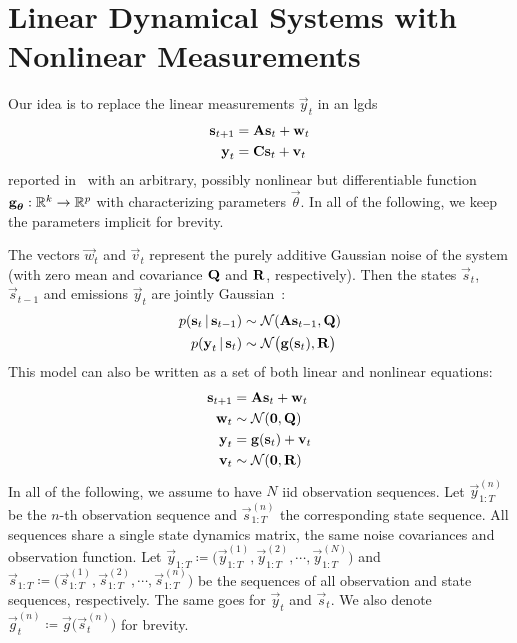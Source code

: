 \section{Linear Dynamical Systems with Nonlinear Measurements}
\label{subsec:slds}



Our idea is to replace the linear measurements \( \vec{y}_t \) in an \ac{lgds}
\begin{align*}
	\boldsymbol{\mathrm{s}}_{t + 1} & = \boldsymbol{\mathrm{A}} \boldsymbol{\mathrm{s}}_t + \boldsymbol{\mathrm{w}}_t \\
	\boldsymbol{\mathrm{y}}_t       & = \boldsymbol{\mathrm{C}} \boldsymbol{\mathrm{s}}_t + \boldsymbol{\mathrm{v}}_t
\end{align*}
reported in~\cite{ghahramaniParameterEstimationLinear1996} with an arbitrary, possibly nonlinear but differentiable function \( \boldsymbol{\mathrm{g}}_{\boldsymbol{\mathrm{\theta}}} : \mathbb{R}^k \to \mathbb{R}^p \) with characterizing parameters \( \vec{\theta} \). In all of the following, we keep the parameters implicit for brevity.

The vectors \( \vec{w}_t \) and \( \vec{v}_t \) represent the purely additive Gaussian noise of the system (with zero mean and covariance \( \boldsymbol{\mathrm{Q}} \) and \( \boldsymbol{\mathrm{R}} \), respectively). Then the states \( \vec{s}_t \), \( \vec{s}_{t - 1} \) and emissions \( \vec{y}_t \) are jointly Gaussian~\cite{minkaHiddenMarkovModels1999}:
\begin{align*}
	p(\boldsymbol{\mathrm{s}}_t \,\vert\, \boldsymbol{\mathrm{s}}_{t - 1}) & \sim \mathcal{N}(\boldsymbol{\mathrm{A}} \boldsymbol{\mathrm{s}}_{t - 1}, \boldsymbol{\mathrm{Q}})    \\
	p(\boldsymbol{\mathrm{y}}_t \,\vert\, \boldsymbol{\mathrm{s}}_t)       & \sim \mathcal{N}\big(\boldsymbol{\mathrm{g}}(\boldsymbol{\mathrm{s}}_t), \boldsymbol{\mathrm{R}}\big)
\end{align*}
This model can also be written as a set of both linear and nonlinear equations:
\begin{align*}
	\boldsymbol{\mathrm{s}}_{t + 1} & = \boldsymbol{\mathrm{A}} \boldsymbol{\mathrm{s}}_t + \boldsymbol{\mathrm{w}}_t  \\
	\boldsymbol{\mathrm{w}}_t       & \sim \mathcal{N}(\boldsymbol{\mathrm{0}}, \boldsymbol{\mathrm{Q}})   \\
	\boldsymbol{\mathrm{y}}_t       & = \boldsymbol{\mathrm{g}}(\boldsymbol{\mathrm{s}}_t) + \boldsymbol{\mathrm{v}}_t \\
	\boldsymbol{\mathrm{v}}_t       & \sim \mathcal{N}(\boldsymbol{\mathrm{0}}, \boldsymbol{\mathrm{R}})
\end{align*}
In all of the following, we assume to have \(N\) \ac{iid} observation sequences. Let \( \vec{y}_{1:T}^{(n)} \) be the \(n\)-th observation sequence and \( \vec{s}_{1:T}^{(n)} \) the corresponding state sequence. All sequences share a single state dynamics matrix, the same noise covariances and observation function. Let \( \vec{y}_{1:T} \coloneqq \big(\vec{y}_{1:T}^{(1)}, \vec{y}_{1:T}^{(2)}, \cdots, \vec{y}_{1:T}^{(N)}\big) \) and \( \vec{s}_{1:T} \coloneqq \big(\vec{s}_{1:T}^{(1)}, \vec{s}_{1:T}^{(2)}, \cdots, \vec{s}_{1:T}^{(n)}\big) \) be the sequences of all observation and state sequences, respectively. The same goes for \( \vec{y}_t \) and \( \vec{s}_t \). We also denote \( \vec{g}_t^{(n)} \coloneqq \vec{g}\big(\vec{s}_t^{(n)}\big) \) for brevity.

